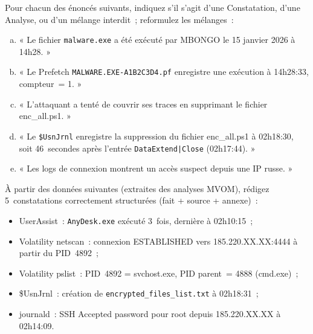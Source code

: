 \begin{boxexo}[title={\ding{45}\quad Exercice~20.1. Identifier constatation vs analyse \niveaubase}]
Pour chacun des énoncés suivants, indiquez s'il s'agit d'une
Constatation, d'une Analyse, ou d'un mélange interdit~; reformulez
les mélanges~:
\begin{enumerate}[(a)]
    \item « Le fichier \texttt{malware.exe} a été exécuté par
          MBONGO le 15 janvier 2026 à 14h28. »
    \item « Le Prefetch \texttt{MALWARE.EXE-A1B2C3D4.pf} enregistre
          une exécution à 14h28:33, compteur~= 1. »
    \item « L'attaquant a tenté de couvrir ses traces en supprimant
          le fichier enc\_all.ps1. »
    \item « Le \texttt{\$UsnJrnl} enregistre la suppression du
          fichier enc\_all.ps1 à 02h18:30, soit 46~secondes après
          l'entrée \texttt{DataExtend|Close} (02h17:44). »
    \item « Les logs de connexion montrent un accès suspect
          depuis une IP russe. »
\end{enumerate}
\end{boxexo}

\begin{boxexo}[title={\ding{45}\quad Exercice~20.2. Rédiger une section Constatations \niveaumoyen}]
À partir des données suivantes (extraites des analyses MVOM),
rédigez 5~constatations correctement structurées (fait + source
+ annexe)~:
\begin{itemize}
    \item UserAssist~: \texttt{AnyDesk.exe} exécuté 3~fois,
          dernière à 02h10:15~;
    \item Volatility netscan~: connexion ESTABLISHED vers
          185.220.XX.XX:4444 à partir du PID~4892~;
    \item Volatility pslist~: PID~4892 = svchost.exe,
          PID parent~= 4888 (cmd.exe)~;
    \item \$UsnJrnl~: création de \texttt{encrypted\_files\_list.txt}
          à 02h18:31~;
    \item journald~: SSH Accepted password pour root depuis
          185.220.XX.XX à 02h14:09.
\end{itemize}
\end{boxexo}

